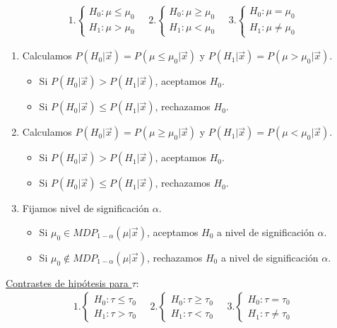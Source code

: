 \begin{align*}
   1. \begin{cases}
        H_0 : \mu \leq \mu_0 \\
        H_1 : \mu > \mu_0
    \end{cases} \quad     2.\begin{cases}
        H_0 : \mu \ge \mu_0 \\
        H_1 : \mu < \mu_0
    \end{cases} \quad     3.\begin{cases}
        H_0 : \mu = \mu_0 \\
        H_1 : \mu \not = \mu_0
    \end{cases}
\end{align*}

\begin{enumerate}
    \item Calculamos $P(H_0 | \vec{x}) = P(\mu\leq \mu_0 |\vec{x})$ y $P(H_1 | \vec{x}) = P(\mu> \mu_0 | \vec{x})$.
    \begin{itemize}
        \item Si $P(H_0 | \vec{x}) > P(H_1 | \vec{x})$, aceptamos $H_0$.
        \item Si $P(H_0 | \vec{x}) \leq P(H_1 | \vec{x})$, rechazamos $H_0$.
    \end{itemize}
        \item Calculamos $P(H_0 | \vec{x}) = P(\mu \ge \mu_0 |\vec{x})$ y $P(H_1 | \vec{x}) = P(\mu < \mu_0 | \vec{x})$.
    \begin{itemize}
        \item Si $P(H_0 | \vec{x}) > P(H_1 | \vec{x})$, aceptamos $H_0$.
        \item Si $P(H_0 | \vec{x}) \leq P(H_1 | \vec{x})$, rechazamos $H_0$.
    \end{itemize}
    \item Fijamos nivel de significación $\alpha$.
    \begin{itemize}
        \item Si $\mu_0 \in MDP_{1 - \alpha}(\mu | \vec{x})$, aceptamos $H_0$ a nivel de significación $\alpha$.
        \item Si $\mu_0 \not\in MDP_{1 - \alpha}(\mu| \vec{x})$, rechazamos $H_0$ a nivel de significación $\alpha$.
    \end{itemize}
\end{enumerate}
\noindent \underline{Contrastes de hipótesis para $\tau$}:
\begin{align*}
   1. \begin{cases}
        H_0 : \tau \leq \tau_0 \\
        H_1 : \tau > \tau_0
    \end{cases} \quad     2.\begin{cases}
        H_0 : \tau \ge \tau_0 \\
        H_1 : \tau < \tau_0
    \end{cases} \quad     3.\begin{cases}
        H_0 : \tau = \tau_0 \\
        H_1 : \tau \not = \tau_0
    \end{cases}
\end{align*}

